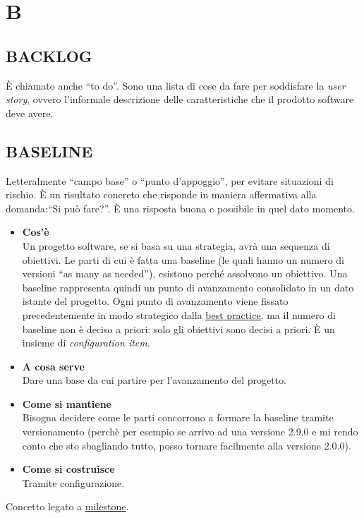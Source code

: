 \newpage
	\section{B} \label{sec:B}

		\subsection{BACKLOG}  \label{backlog}
		È chiamato anche ``to do''. Sono una lista di cose da fare per soddisfare la \textit{user story}, ovvero l'informale descrizione delle caratteristiche che il prodotto software deve avere.


		\subsection{BASELINE}   \label{baseline}
		Letteralmente ``campo base'' o ``punto d'appoggio'', per evitare situazioni di rischio. È un risultato concreto che risponde in maniera affermativa alla domanda:``Si può fare?''. È una risposta buona e possibile in quel dato momento.
		\begin{itemize}
			\item \textbf{Cos'è} \\
			Un progetto software, se si basa su una strategia, avrà una sequenza di obiettivi. Le parti di cui è fatta una baseline (le quali hanno un numero di versioni ``as many as needed''), esistono perché assolvono un obiettivo. Una baseline rappresenta quindi un punto di avanzamento consolidato in un dato istante del progetto. Ogni punto di avanzamento viene fissato precedentemente in modo strategico dalla \underline{\hyperref[best]{best practice}}, ma il numero di baseline non è deciso a priori: solo gli obiettivi sono decisi a priori.
			È un insieme di \textit{configuration item}.
			\item \textbf{A cosa serve} \\
			Dare una base da cui partire per l'avanzamento del progetto.
			\item \textbf{Come si mantiene} \\
			Bisogna decidere come le parti concorrono a formare la baseline tramite versionamento (perchè per esempio se arrivo ad una versione 2.9.0 e mi rendo conto che sto sbagliando tutto, posso tornare facilmente alla versione 2.0.0).
			\item \textbf{Come si costruisce} \\
			Tramite configurazione.
		\end{itemize}
		Concetto legato a \underline{\hyperref[milestone]{milestone}}.


